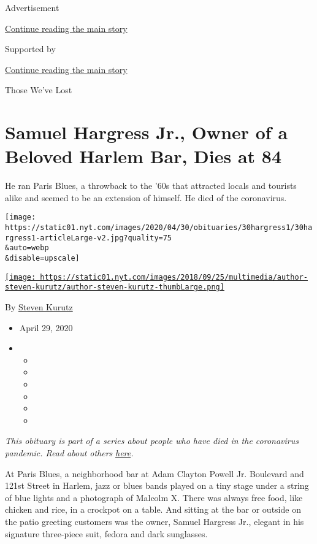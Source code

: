 Advertisement

\protect\hyperlink{after-top}{Continue reading the main story}

Supported by

\protect\hyperlink{after-sponsor}{Continue reading the main story}

Those We've Lost

\hypertarget{samuel-hargress-jr-owner-of-a-beloved-harlem-bar-dies-at-84}{%
\section{Samuel Hargress Jr., Owner of a Beloved Harlem Bar, Dies at
84}\label{samuel-hargress-jr-owner-of-a-beloved-harlem-bar-dies-at-84}}

He ran Paris Blues, a throwback to the '60s that attracted locals and
tourists alike and seemed to be an extension of himself. He died of the
coronavirus.

\texttt{[image: https://static01.nyt.com/images/2020/04/30/obituaries/30hargress1/30hargress1-articleLarge-v2.jpg?quality=75\\\&auto=webp\\\&disable=upscale]}

\href{https://www.nytimes.com/by/steven-kurutz}{\texttt{[image: https://static01.nyt.com/images/2018/09/25/multimedia/author-steven-kurutz/author-steven-kurutz-thumbLarge.png]}}

By \href{https://www.nytimes.com/by/steven-kurutz}{Steven Kurutz}

\begin{itemize}
\item
  April 29, 2020
\item
  \begin{itemize}
  \item
  \item
  \item
  \item
  \item
  \item
  \end{itemize}
\end{itemize}

\emph{This obituary is part of a series about people who have died in
the coronavirus pandemic. Read about others}
\href{https://www.nytimes.com/series/people-who-have-died-of-the-coronavirus}{\emph{here}}\emph{.}

At Paris Blues, a neighborhood bar at Adam Clayton Powell Jr. Boulevard
and 121st Street in Harlem, jazz or blues bands played on a tiny stage
under a string of blue lights and a photograph of Malcolm X. There was
always free food, like chicken and rice, in a crockpot on a table. And
sitting at the bar or outside on the patio greeting customers was the
owner, Samuel Hargress Jr., elegant in his signature three-piece suit,
fedora and dark sunglasses.

